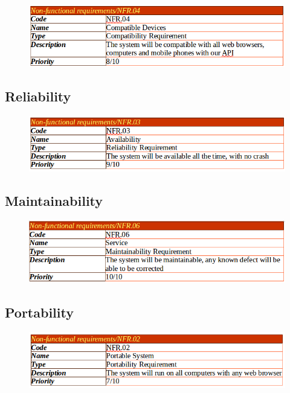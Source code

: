 \documentclass[]{article}
\begin{document}
\begin{figure}[H]
\centering
\includegraphics[scale=0.4]{./nonf/02}
\end{figure}

\subsection {Reliability}

\begin{figure}[H]
\centering
\includegraphics[scale=0.4]{./nonf/03}
\end{figure}

\subsection {Maintainability}

\begin{figure}[H]
\centering
\includegraphics[scale=0.4]{./nonf/04}
\end{figure}

\subsection {Portability}

\begin{figure}[H]
\centering
\includegraphics[scale=0.4]{./nonf/05}
\end{figure}
\end{document}
